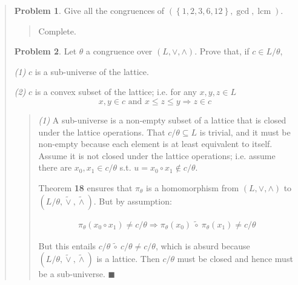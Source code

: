 \documentclass[a4paper, 12pt]{article}
\theoremstyle{definition}
\newtheorem{problem}{Problem}
\theoremstyle{definition}
\theoremstyle{definition}
\DeclareMathOperator{\lcm}{lcm}
\begin{document}
\begin{quote}
\begin{quote}
\end{quote}
\normalsize

\begin{problem}
    Give all the congruences of $(\left\{ 1, 2, 3, 6, 12 \right\}, \gcd, \lcm )$.
\end{problem}


\small
\begin{quote}


    Complete.


\end{quote}
\normalsize

\begin{problem}
    Let $\theta$ a congruence over $(L, \lor , \land )$. Prove 
    that, if $c \in L / \theta$,

    \textit{(1)} $c$ is a sub-universe of the lattice.

    \textit{(2)} $c$ is a convex subset of the lattice; i.e. for any 
    $x,y,z \in L$ 
    \begin{equation*}
        x,y \in c \text{ and } x \leq z \leq y \Rightarrow z\in c
    \end{equation*}
\end{problem}


\small
\begin{quote}

    \textit{(1)} A sub-universe is a non-empty subset of a lattice that 
    is closed under the lattice operations. That $c / \theta \subseteq L$ 
    is trivial, and it must be non-empty because each element is 
    at least equivalent to itself. Assume it is not closed under 
    the lattice operations; i.e. assume there are $x_0, x_1 \in c /\theta$
    s.t. $u = x_0 \circ x_1 \not\in c / \theta$. 

    Theorem \textbf{18} ensures that $\pi_{\theta}$ is a homomorphism from $(L,
    \lor , \land )$ to $(L / \theta, \widetilde{ \lor  }, \widetilde{ \land  }
    ) $. But by assumption:

    \begin{align*}
        \pi_{\theta}(x_0 \circ x_1) \neq c /\theta \Rightarrow \pi_{\theta}(x_0) ~\widetilde{ \circ } ~ \pi_{\theta}(x_1) \neq c / \theta
    \end{align*}

    But this entails $c / \theta ~ \widetilde{ \circ } ~ c / \theta \neq c / \theta$, 
    which is absurd because $(L / \theta, \widetilde{ \lor  }, \widetilde{
    \land  } ) $ is a lattice. Then $c / \theta$ must be closed and hence must
    be a sub-universe. $\blacksquare$


\end{quote}
\end{quote}
\end{document}
